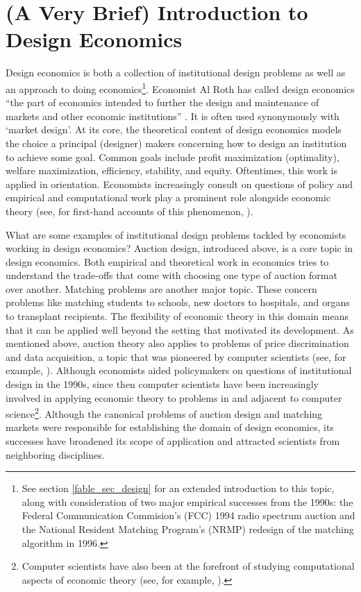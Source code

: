 

\section{(A Very Brief) Introduction to Design Economics}\label{intro_sec_whatis}

Design economics is both a collection of institutional design problems as well as an approach to doing economics\footnote{See section \ref{fable_sec_design} for an extended introduction to this topic, along with consideration of two major empirical successes from the 1990s: the Federal Communication Commision's (FCC) 1994 radio spectrum auction and the National Resident Matching Program's (NRMP) redesign of the matching algorithm in 1996.}. Economist Al Roth has called design economics ``the part of economics intended to further the design and maintenance of markets and other economic institutions'' \autocite[1341]{roth2002}. It is often used synonymously with `market design'. At its core, the theoretical content of design economics models the choice a principal (designer) makers concerning how to design an institution to achieve some goal. Common goals include profit maximization (optimality), welfare maximization, efficiency, stability, and equity. Oftentimes, this work is applied in orientation. Economists increasingly consult on questions of policy and empirical and computational work play a prominent role alongside economic theory (see, for first-hand accounts of this phenomenon, \cite{binmore2002, roth2019, sönmez2023minimalist}). 

What are some examples of institutional design problems tackled by economists working in design economics? Auction design, introduced above, is a core topic in design economics. Both empirical and theoretical work in economics tries to understand the trade-offs that come with choosing one type of auction format over another. Matching problems are another major topic. These concern problems like matching students to schools, new doctors to hospitals, and organs to transplant recipients. The flexibility of economic theory in this domain means that it can be applied well beyond the setting that motivated its development. As mentioned above, auction theory also applies to problems of price discrimination and data acquisition, a topic that was pioneered by computer scientists (see, for example, \cite{roth2012surveys, cai2015}). Although economists aided policymakers on questions of institutional design in the 1990s, since then computer scientists have been increasingly involved in applying economic theory to problems in and adjacent to computer science\footnote{Computer scientists have also been at the forefront of studying computational aspects of economic theory (see, for example, \cite{nisan2007algorithmic}).}. Although the canonical problems of auction design and matching markets were responsible for establishing the domain of design economics, its successes have broadened its scope of application and attracted scientists from neighboring disciplines.

